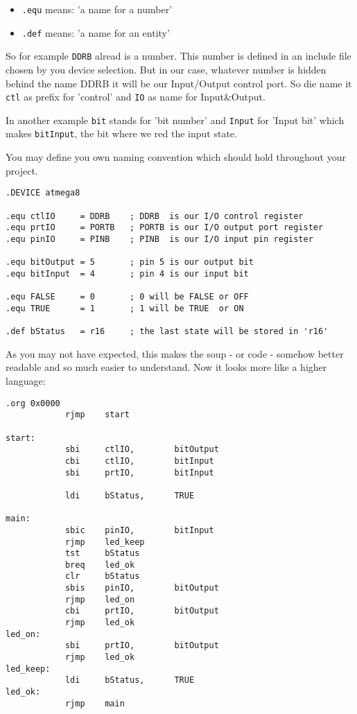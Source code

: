 \begin{itemize}
  \item \texttt{.equ} means: 'a name for a number'
  \item \texttt{.def} means: 'a name for an entity'
\end{itemize}

So for example \texttt{DDRB} alread is a number. This number is defined in an include file chosen by you device selection. But in our case, whatever number is hidden behind the name DDRB it will be our Input/Output control port. So die name it \texttt{ctl} as prefix for 'control' and \texttt{IO} as name for Input\&Output.

In another example \texttt{bit} stands for 'bit number' and \texttt{Input} for 'Input bit' which makes \texttt{bitInput}, the bit where we red the input state.

You may define you own naming convention which should hold throughout your project.

\begin{lstlisting}
.DEVICE atmega8

.equ ctlIO     = DDRB    ; DDRB  is our I/O control register
.equ prtIO     = PORTB   ; PORTB is our I/O output port register
.equ pinIO     = PINB    ; PINB  is our I/O input pin register

.equ bitOutput = 5       ; pin 5 is our output bit
.equ bitInput  = 4       ; pin 4 is our input bit

.equ FALSE     = 0       ; 0 will be FALSE or OFF
.equ TRUE      = 1       ; 1 will be TRUE  or ON

.def bStatus   = r16     ; the last state will be stored in 'r16'
\end{lstlisting}

As you may not have expected, this makes the soup - or code - somehow better readable and so much easier to understand. Now it looks more like a higher language:

\begin{lstlisting}
.org 0x0000
            rjmp    start

start:
            sbi     ctlIO,        bitOutput
            cbi     ctlIO,        bitInput
            sbi     prtIO,        bitInput

            ldi     bStatus,      TRUE

main:
            sbic    pinIO,        bitInput
            rjmp    led_keep
            tst     bStatus
            breq    led_ok
            clr     bStatus
            sbis    pinIO,        bitOutput
            rjmp    led_on
            cbi     prtIO,        bitOutput
            rjmp    led_ok
led_on:
            sbi     prtIO,        bitOutput
            rjmp    led_ok
led_keep:
            ldi     bStatus,      TRUE
led_ok:
            rjmp    main
\end{lstlisting}

